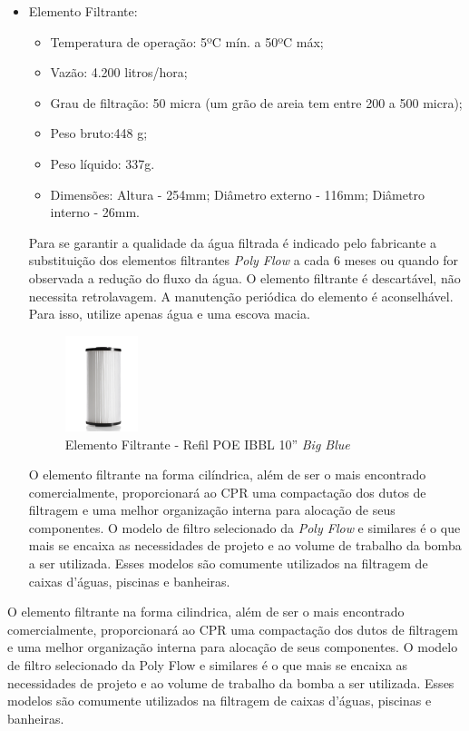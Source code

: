 \begin{description}
\begin{itemize}
\begin{figure}[h]
  \end{figure}
  \FloatBarrier
  \par
  \item Elemento Filtrante:
  \begin{itemize}
    \item Temperatura de operação:  5ºC mín. a 50ºC máx;
    \item Vazão: 4.200 litros/hora;
    \item Grau de filtração: 50 micra (um grão de areia tem entre 200 a 500 micra);
    \item Peso bruto:448 g;
    \item Peso líquido: 337g.
    \item Dimensões: Altura - 254mm; Diâmetro externo - 116mm; Diâmetro interno - 26mm.
  \end{itemize}
  Para se garantir a qualidade da água filtrada é indicado pelo fabricante a
  substituição dos elementos filtrantes \textit{Poly Flow} a cada 6 meses ou quando
  for observada a redução do fluxo da água. O elemento filtrante é descartável,
  não necessita retrolavagem. A manutenção periódica do elemento é aconselhável.
  Para isso, utilize apenas água e uma escova macia.
  \par
  \begin{figure}[h]
    \centering
    \includegraphics[width=0.2\textwidth]{figures/filter.png}
    \caption{Elemento Filtrante - Refil POE IBBL 10'' \textit{Big Blue}}
    \label{fig:mesh-aluminium}
  \end{figure}
  \FloatBarrier
  \par
  O elemento filtrante na forma cilíndrica, além de ser o mais encontrado
  comercialmente, proporcionará ao CPR uma compactação dos dutos de filtragem
  e uma melhor organização interna para alocação de seus componentes. O modelo
  de filtro selecionado da \textit{Poly Flow} e similares é o que mais se encaixa as
  necessidades de projeto e ao volume de trabalho da bomba a ser utilizada. Esses
  modelos são comumente utilizados na filtragem de caixas d’águas, piscinas e banheiras.
\end{itemize}
\par
O elemento filtrante na forma cilindrica, além de ser o mais encontrado
comercialmente, proporcionará ao CPR uma compactação dos dutos de filtragem e
uma melhor organização interna para alocação de seus componentes. O modelo de
filtro selecionado da Poly Flow e similares é o que mais se encaixa as
necessidades de projeto e ao volume de trabalho da bomba a ser utilizada.
Esses modelos são comumente utilizados na filtragem de caixas d’águas, piscinas
e banheiras.


\end{description}
